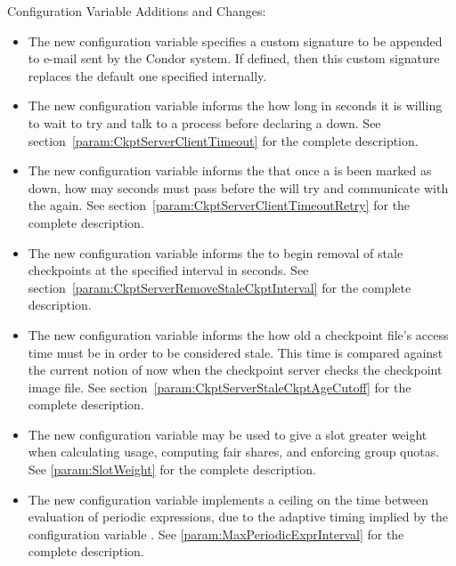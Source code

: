 \noindent Configuration Variable Additions and Changes:

\begin{itemize}

\item The new configuration variable  specifies
a custom signature to be appended to e-mail sent by the Condor system.
If defined, then this custom signature replaces the
default one specified internally.

\item The new configuration variable 
informs the  how long in seconds it is willing to wait
to try and talk to a  process before declaring a
 down.
See section~\ref{param:CkptServerClientTimeout} for the complete description.

\item The new configuration variable
 informs the 
that once a  is been marked as down, how may seconds
must pass before the  will try and communicate with the
 again.
See section~\ref{param:CkptServerClientTimeoutRetry} 
for the complete description.

\item The new configuration variable
 informs the
 to begin removal of stale checkpoints at the specified
interval in seconds.
See section~\ref{param:CkptServerRemoveStaleCkptInterval} 
for the complete description.

\item The new configuration variable
 informs the
 how old a checkpoint file's access time must be
in order to be considered stale. This time is compared against the
current notion of now
when the checkpoint server checks the checkpoint image file.
See section~\ref{param:CkptServerStaleCkptAgeCutoff} 
for the complete description.

\item The new configuration variable  may be used to
give a slot greater weight when calculating usage, computing fair
shares, and enforcing group quotas.  
See \ref{param:SlotWeight} for the complete description.

\item The new configuration variable 
  implements a ceiling on the time between evaluation of periodic expressions,
  due to the adaptive timing implied by the configuration variable
  .
  See \ref{param:MaxPeriodicExprInterval} for the complete description.


\end{itemize}
